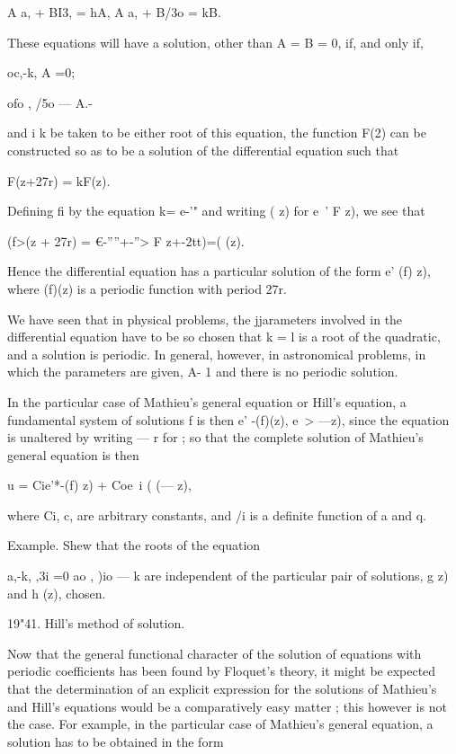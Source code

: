 A a, + BI3, = hA, A a, + B/3o = kB. 

These equations will have a solution, other than A = B = 0, if, and 
only if, 

oc,-k, A =0; 

ofo , /5o — A.- 

and i  k be taken to be either root of this equation, the function F(2) can be 
constructed so as to be a solution of the differential equation such that 

F(z+27r) = kF(z). 

Defining fi by the equation k= e-'"  and writing (  z) for e~' F z), we see 
that 

(f>(z + 27r) = €-''''+-''> F z+-2tt)=(  (z). 

Hence the differential equation has a particular solution of the form 
e'  (f) z), where (f)(z) is a periodic function with period 27r. 

We have seen that in physical problems, the jjarameters involved in the 
differential equation have to be so chosen that k = l is a root of the quadratic, 
and a solution is periodic. In general, however, in astronomical problems, in 
which the parameters are given, A-   1 and there is no periodic solution. 

In the particular case of Mathieu's general equation or Hill's equation, a 
fundamental system of solutions f is then e' -(f)(z), e~>   —z), since the 
equation is unaltered by writing —  r for   ; so that the complete solution of 
Mathieu's general equation is then 

u = Cie'*-(f)  z) + Coe~i (  (— z), 

where Ci, c, are arbitrary constants, and /i is a definite function of a and q. 

Example. Shew that the roots of the equation 

a,-k, ,3i =0 
ao , )io — k 
are independent of the particular pair of solutions, g  z) and h (z), chosen. 

19"41. Hill's method of solution. 

Now that the general functional character of the solution of equations 
with periodic coefficients has been found by Floquet's theory, it might be 
expected that the determination of an explicit expression for the solutions of 
Mathieu's and Hill's equations would be a comparatively easy matter ; this 
however is not the case. For example, in the particular case of Mathieu's 
general equation, a solution has to be obtained in the form 

